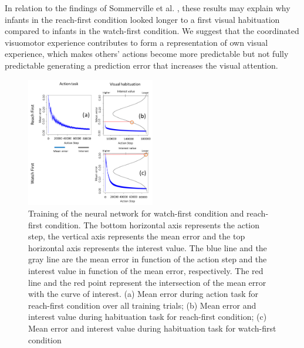 \documentclass[conference]{IEEEtran}
\begin{document}
In relation to the findings of Sommerville et al. \cite{sommerville2005action}, these results may explain why infants in the reach-first condition looked longer to a first visual habituation compared to infants in the watch-first condition. We suggest that the coordinated visuomotor experience contributes to form a representation of own visual experience, which makes others' actions become more predictable but not fully predictable generating a prediction error that increases the visual attention.

\begin{figure}
\centering
\includegraphics[width=0.5\textwidth,natwidth=700,natheight=250]{AT_HT_with_Attention_2.png}
\caption{Training of the neural network for watch-first condition and reach-first condition. The bottom horizontal axis represents the action step, the vertical axis represents the mean error and the top horizontal axis represents the interest value. The blue line and the gray line are the mean error in function of the action step and the interest value in function of the mean error, respectively. The red line and the red point represent the intersection of the mean error with the curve of interest. (a) Mean error during action task for reach-first condition over all training trials; (b) Mean error and interest value during habituation task for reach-first condition; (c) Mean error  and interest value during habituation task for watch-first condition}
\label{Error}
\end{figure}
\end{document}
